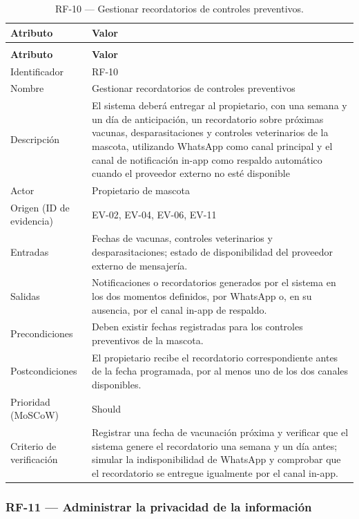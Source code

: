 \documentclass[journal,onecolumn]{IEEEtran}
\makeatletter
\newenvironment{atributos}[2]{%
	\small
	\begin{longtable}{@{}>{\raggedright\arraybackslash}p{4.2cm} >{\raggedright\arraybackslash}p{11.2cm}@{}}
		\caption{#2}\label{tab:#1}\\
		\toprule
		\textbf{Atributo} & \textbf{Valor} \\
		\midrule
		\endfirsthead
		\multicolumn{2}{@{}l}{\small\itshape (continuación)}\\
		\toprule
		\textbf{Atributo} & \textbf{Valor} \\
		\midrule
		\endhead
		\bottomrule
		\endlastfoot
	}{%
	\end{longtable}
	\normalsize
}
\makeatother
\begin{document}
	\begin{atributos}{RF-10}{RF-10 --- Gestionar recordatorios de controles preventivos.}
		Identificador & RF-10 \\
		Nombre & Gestionar recordatorios de controles preventivos \\
		Descripción & El sistema deberá entregar al propietario, con una semana y un día de anticipación, un recordatorio sobre próximas vacunas, desparasitaciones y controles veterinarios de la mascota, utilizando WhatsApp como canal principal y el canal de notificación in-app como respaldo automático cuando el proveedor externo no esté disponible \\
		Actor & Propietario de mascota \\
		Origen (ID de evidencia) & EV-02, EV-04, EV-06, EV-11 \\
		Entradas & Fechas de vacunas, controles veterinarios y desparasitaciones; estado de disponibilidad del proveedor externo de mensajería. \\
		Salidas & Notificaciones o recordatorios generados por el sistema en los dos momentos definidos, por WhatsApp o, en su ausencia, por el canal in-app de respaldo. \\
		Precondiciones & Deben existir fechas registradas para los controles preventivos de la mascota. \\
		Postcondiciones & El propietario recibe el recordatorio correspondiente antes de la fecha programada, por al menos uno de los dos canales disponibles. \\
		Prioridad (MoSCoW) & Should \\
		Criterio de verificación & Registrar una fecha de vacunación próxima y verificar que el sistema genere el recordatorio una semana y un día antes; simular la indisponibilidad de WhatsApp y comprobar que el recordatorio se entregue igualmente por el canal in-app. \\
	\end{atributos}
	
	
	\subsubsection{RF-11 --- Administrar la privacidad de la información}
	
\end{document}
